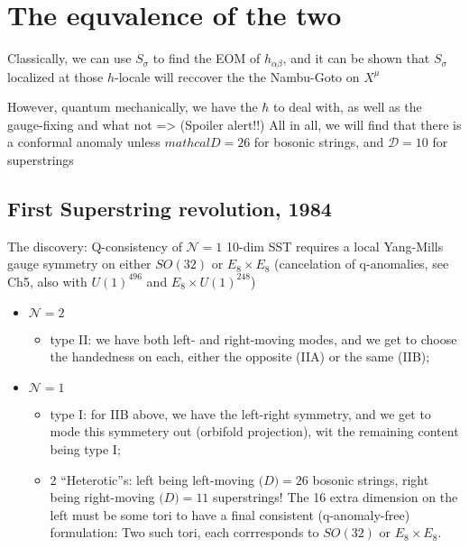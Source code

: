 \documentclass[
]{book}
\providecommand{\tightlist}{%
  \setlength{\itemsep}{0pt}\setlength{\parskip}{0pt}}
\begin{document}
\hypertarget{the-equvalence-of-the-two}{%
\section{The equvalence of the two}\label{the-equvalence-of-the-two}}

Classically, we can use \(S_\sigma\) to find the EOM of \(h_{\alpha\beta}\), and it can be shown that \(S_\sigma\) localized at those \(h\)-locale will reccover the the Nambu-Goto on \(X^\mu\)

However, quantum mechanically, we have the \(\hbar\) to deal with, as well as the gauge-fixing and what not =\textgreater{} (Spoiler alert!!) All in all, we will find that there is a conformal anomaly unless \(mathcal{D}=26\) for bosonic strings, and \(\mathcal{D}=10\) for superstrings

\hypertarget{first-superstring-revolution-1984}{%
\subsection{First Superstring revolution, 1984}\label{first-superstring-revolution-1984}}

The discovery: Q-consistency of \(\mathcal{N}=1\) 10-dim SST requires a local Yang-Mills gauge symmetry on either \(SO(32)\) or \(E_8\times E_8\) (cancelation of q-anomalies, see Ch5, also with \(U(1)^{496}\) and \(E_8 \times U(1)^{248}\))

\begin{itemize}
\tightlist
\item
  \(\mathcal{N}=2\)

  \begin{itemize}
  \tightlist
  \item
    type II: we have both left- and right-moving modes, and we get to choose the handedness on each, either the opposite (IIA) or the same (IIB);
  \end{itemize}
\item
  \(\mathcal{N}=1\)

  \begin{itemize}
  \tightlist
  \item
    type I: for IIB above, we have the left-right symmetry, and we get to mode this symmetery out (orbifold projection), wit the remaining content being type I;
  \item
    2 ``Heterotic''s: left being left-moving \(\mathcal(D)=26\) bosonic strings, right being right-moving \(\mathcal(D)=11\) superstrings! The 16 extra dimension on the left must be some tori to have a final consistent (q-anomaly-free) formulation: Two such tori, each corrresponds to \(SO(32)\) or \(E_8\times E_8\).
  \end{itemize}
\end{itemize}
\end{document}
